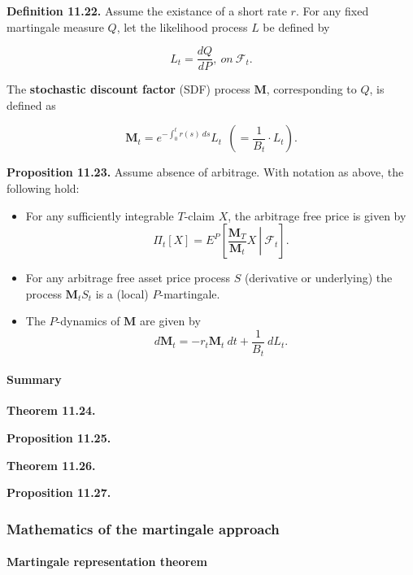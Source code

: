 \documentclass[
]{article}
\providecommand{\tightlist}{%
  \setlength{\itemsep}{0pt}\setlength{\parskip}{0pt}}
\begin{document}
\textbf{Definition 11.22.} Assume the existance of a short rate \(r\).
For any fixed martingale measure \(Q\), let the likelihood process \(L\)
be defined by

\[
L_t=\frac{dQ}{dP},\ on\ \mathcal{F}_t.
\]

The \textbf{stochastic discount factor} (SDF) process \(\mathbf{M}\),
corresponding to \(Q\), is defined as

\[
\mathbf{M}_t=e^{-\int_0^tr(s)\ ds}L_t\ \ \left(=\frac{1}{B_t}\cdot L_t\right).
\]

\textbf{Proposition 11.23.} Assume absence of arbitrage. With notation
as above, the following hold:

\begin{itemize}
\tightlist
\item
  For any sufficiently integrable \(T\)-claim \(X\), the arbitrage free
  price is given by \[
    \Pi_t[X]=E^P\left[\left. \frac{\mathbf{M}_T}{\mathbf{M}_t} X \ \right\vert\ \mathcal{F}_t\right].
    \]
\item
  For any arbitrage free asset price process \(S\) (derivative or
  underlying) the process \(\mathbf{M}_tS_t\) is a (local)
  \(P\)-martingale.
\item
  The \(P\)-dynamics of \(\mathbf{M}\) are given by \[
    d\mathbf{M}_t=-r_t\mathbf{M}_t\ dt+\frac{1}{B_t}\ dL_t.
    \]
\end{itemize}

\hypertarget{summary}{%
\paragraph{Summary}\label{summary}}

\textbf{Theorem 11.24.}

\textbf{Proposition 11.25.}

\textbf{Theorem 11.26.}

\textbf{Proposition 11.27.}

\hypertarget{mathematics-of-the-martingale-approach}{%
\subsubsection{Mathematics of the martingale
approach}\label{mathematics-of-the-martingale-approach}}

\hypertarget{martingale-representation-theorem}{%
\paragraph{Martingale representation
theorem}\label{martingale-representation-theorem}}
\end{document}
